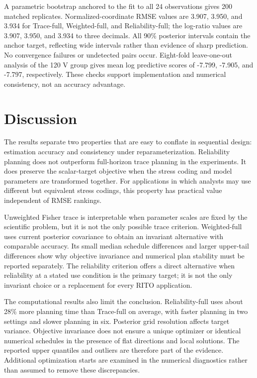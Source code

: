 \documentclass[a4paper,fleqn]{cas-sc}
\begin{document}
A parametric bootstrap anchored to the fit to all 24 observations gives 200 matched replicates. Normalized-coordinate RMSE values are 3.907, 3.950, and 3.934 for Trace-full, Weighted-full, and Reliability-full; the log-ratio values are 3.907, 3.950, and 3.934 to three decimals. All 90\% posterior intervals contain the anchor target, reflecting wide intervals rather than evidence of sharp prediction. No convergence failures or undetected pairs occur. Eight-fold leave-one-out analysis of the 120 V group gives mean log predictive scores of -7.799, -7.905, and -7.797, respectively. These checks support implementation and numerical consistency, not an accuracy advantage.

\section{Discussion}

The results separate two properties that are easy to conflate in sequential design: estimation accuracy and consistency under reparameterization. Reliability planning does not outperform full-horizon trace planning in the experiments. It does preserve the scalar-target objective when the stress coding and model parameters are transformed together. For applications in which analysts may use different but equivalent stress codings, this property has practical value independent of RMSE rankings.

Unweighted Fisher trace is interpretable when parameter scales are fixed by the scientific problem, but it is not the only possible trace criterion. Weighted-full uses current posterior covariance to obtain an invariant alternative with comparable accuracy. Its small median schedule differences and larger upper-tail differences show why objective invariance and numerical plan stability must be reported separately. The reliability criterion offers a direct alternative when reliability at a stated use condition is the primary target; it is not the only invariant choice or a replacement for every RITO application.

The computational results also limit the conclusion. Reliability-full uses about 28\% more planning time than Trace-full on average, with faster planning in two settings and slower planning in six. Posterior grid resolution affects target variance. Objective invariance does not ensure a unique optimizer or identical numerical schedules in the presence of flat directions and local solutions. The reported upper quantiles and outliers are therefore part of the evidence. Additional optimization starts are examined in the numerical diagnostics rather than assumed to remove these discrepancies.
\end{document}
